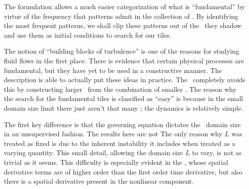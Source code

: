 The {\spt} formulation allows a much easier categorization of what is
``fundamental'' by virtue of the frequency that patterns admit in the
collection of \twots. By identifying the most frequent patterns, we shall
clip these patterns out of the \twots\ they shadow and use them as initial
conditions to search for our tiles.  


The notion of ``building blocks of turbulence'' is one of the reasons for
studying fluid flows in the first place. There is evidence that certain
physical processes are fundamental, but they have yet to be used in a
constructive manner. The {\spt} description is able to actually put
these ideas in practice. 
The \spt\ completely avoids this by constructing larger \twots\
from the combination of smaller \twots. 
The reason
why the search for the fundamental tiles is classified as ``easy'' is because
in the small domain size limit there just aren't that many \twots; the dynamics
is relatively simple.

The first key difference is that the governing equation
dictates the \spt\ domain size in an unsupervised
fashion. The results here are not  
The only reason why $L$ was treated as fixed is due to the
inherent instability it includes when treated as a varying quantity.
This small detail, allowing the domain size $L$ to vary,
is not as trivial as it seems.
 This difficulty
is especially evident in the \KSe, whose spatial derivative terms
are of higher order than the first order time derivative, but also
there is a spatial derivative present in the nonlinear component.




